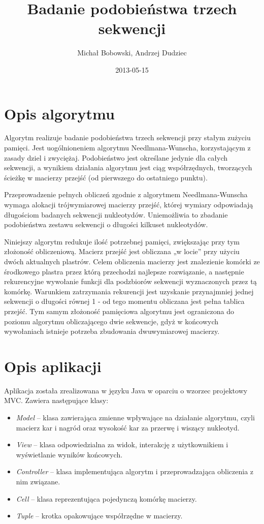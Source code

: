 \documentclass[a4paper,12pt,oneside,notitlepage,onecolumn]{article}
\author{Michał Bobowski, Andrzej Dudziec}
\date{2013-05-15}
\title{Badanie podobieństwa trzech sekwencji}
\begin{document}
  \maketitle

\section{Opis algorytmu}

Algorytm realizuje badanie podobieństwa trzech sekwencji przy stałym zużyciu pamięci.
Jest uogólnioneniem algorytmu Needlmana-Wunscha, korzystającym z zasady dziel i zwyciężaj.
Podobieństwo jest określane jedynie dla całych sekwencji, a wynikiem działania algorytmu jest ciąg współrzędnych, tworzących ścieżkę w macierzy przejść (od pierwszego do ostatniego punktu).

Przeprowadzenie pełnych obliczeń zgodnie z algorytmem Needlmana-Wunscha wymaga alokacji trójwymiarowej macierzy przejść, której wymiary odpowiadają długościom badanych sekwencji nukleotydów. 
Uniemożliwia to zbadanie podobieństwa zestawu sekwencji o długości kilkuset nukleotydów.

Niniejszy algorytm redukuje ilość potrzebnej pamięci, zwiększając przy tym złożoność obliczeniową. 
Macierz przejść jest obliczana „w locie” przy użyciu dwóch aktualnych plastrów. 
Celem obliczenia macierzy jest znalezienie komórki ze środkowego plastra przez którą przechodzi najlepsze rozwiązanie, a następnie rekurencyjne wywołanie funkcji dla podzbiorów sekwencji wyznaczonych przez tą komórkę.
Warunkiem zatrzymania rekurencji jest uzyskanie przynajmniej jednej sekwencji o długości równej 1 - od tego momentu obliczana jest pełna tablica przejść.
Tym samym złożoność pamięciowa algorytmu jest ograniczona do poziomu algorytmu obliczającego dwie sekwencje, gdyż w końcowych wywołaniach istnieje potrzeba zbudowania dwuwymiarowej macierzy.

\section{Opis aplikacji}
Aplikacja została zrealizowana w języku Java w oparciu o wzorzec projektowy MVC. Zawiera następujące klasy:
\begin{itemize}
 \item \emph{Model} – klasa zawierająca zmienne wpływające na działanie algorytmu, czyli macierz kar i nagród oraz wysokość kar za przerwę i wiszący nukleotyd.
 \item \emph{View} – klasa odpowiedzialna za widok, interakcję z użytkownikiem i wyświetlanie wyników końcowych.
 \item \emph{Controller} – klasa implementująca algorytm i przeprowadzająca obliczenia z nim związane.
 \item \emph{Cell} – klasa reprezentująca pojedynczą komórkę macierzy.
 \item \emph{Tuple} – krotka opakowujące współrzędne w macierzy.
\end{itemize}
\end{document}
